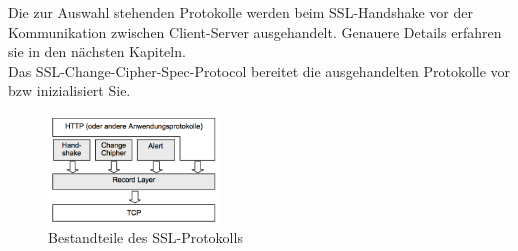 \documentclass[11pt]{scrartcl}
\begin{document}
\noindent
Die zur Auswahl stehenden Protokolle werden beim SSL-Handshake vor der Kommunikation zwischen Client-Server ausgehandelt. Genauere Details erfahren sie in den nächsten Kapiteln.\\
\grqq{}Das SSL-Change-Cipher-Spec-Protocol bereitet die ausgehandelten Protokolle vor bzw inizialisiert Sie.\grqq{}\cite{6}
\cite{6}
\begin{figure}[H]
\includegraphics[width=0.40\textwidth]{Bilder/TLS/SSLTLS-TCPIP}
	\caption{Bestandteile des SSL-Protokolls \cite{1}}
	\label{fig14}
\end{figure}
\end{document}
